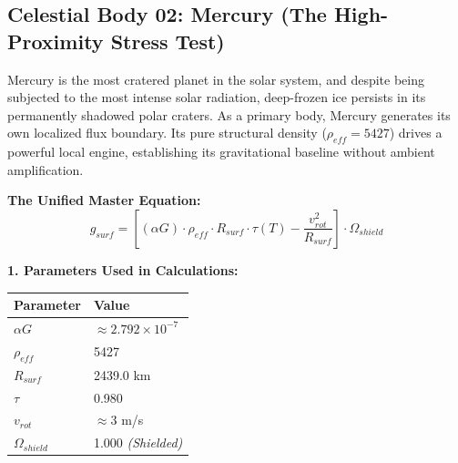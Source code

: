 \documentclass[11pt, a4paper]{article}
\begin{document}
\clearpage
\subsection{Celestial Body 02: Mercury (The High-Proximity Stress Test)}
  Mercury is the most cratered planet in the solar system, and despite being subjected to the most intense solar radiation, deep-frozen ice persists in its permanently shadowed polar craters. As a primary body, Mercury generates its own localized flux boundary. Its pure structural density ($\rho_{eff} = 5427$) drives a powerful local engine, establishing its gravitational baseline without ambient amplification.

  \vspace{0.5em}
  \noindent \textbf{The Unified Master Equation:}
  $$ g_{surf} = \left[ (\alpha G) \cdot \rho_{eff} \cdot R_{surf} \cdot \tau(T) - \frac{v_{rot}^2}{R_{surf}} \right] \cdot \Omega_{shield} $$

  \vspace{0.5em}
  \noindent \textbf{1. Parameters Used in Calculations:} \\[0.5em]
  \begingroup
  \renewcommand{\arraystretch}{1.3}
  \hspace*{2em}
  \begin{tabular}{|l|l|}
    \hline
    \textbf{Parameter} & \textbf{Value} \\ \hline
    $\alpha G$ & $\approx 2.792 \times 10^{-7}$ \\ \hline
    $\rho_{eff}$ & 5427 \\ \hline
    $R_{surf}$ & 2439.0 km \\ \hline
    $\tau$ & 0.980 \\ \hline
    $v_{rot}$ & $\approx 3$ m/s \\ \hline
    $\Omega_{shield}$ & 1.000 \textit{(Shielded)} \\ \hline
  \end{tabular}
  \endgroup
\end{document}
